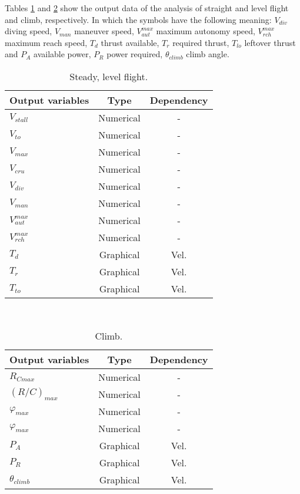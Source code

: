 \documentclass[10pt]{SelfArx} %
\begin{document}
Tables \ref{Tab:output_steady} and \ref{Tab:output_climb} show the output data of the analysis of straight and level flight and climb, respectively.  In which the symbols have the following meaning: $V_{div}$ diving speed, $V_{man}$ maneuver speed, $V_{aut}^{max}$ maximum autonomy speed, $V_{rch}^{max}$ maximum reach speed, $T_{d}$ thrust available, $T_{r}$ required thrust, $T_{lo}$ leftover thrust and $P_{A}$ available power, $P_{R}$ power required, $\theta_{climb}$ climb angle.

\begin{table}[htb]
\small\sf\centering
\caption{Steady, level flight.\label{Tab:output_steady}}
\begin{tabular}{lcc}
\toprule
Output variables 		&Type 		&Dependency 	\\
\midrule
{$V_{stall}$} 		&Numerical 		&- 			\\
{$V_{to}$} 			&Numerical 		&- 			\\
{$V_{max}$} 		&Numerical 		&- 			\\
{$V_{cru}$} 			&Numerical 		&- 			\\
{$V_{div}$} 			&Numerical 		&- 			\\
{$V_{man}$} 		&Numerical 		&- 			\\
{$V_{aut}^{max}$} 	&Numerical 		&- 			\\
{$V_{rch}^{max}$} 	&Numerical 		&- 			\\
{$T_{d}$} 			&Graphical 		&Vel. 			\\
{$T_{r}$} 			&Graphical 		&Vel. 			\\
{$T_{to}$} 			&Graphical 		&Vel. 			\\
\bottomrule
\end{tabular}\\[16pt]
\end{table}

\begin{table}[htb]
\small\sf\centering
\caption{Climb.\label{Tab:output_climb}}
\begin{tabular}{lcc}
\toprule
Output variables 				&Type 		&Dependency 	\\
\midrule
{$R_{Cmax}$} 				&Numerical		&- 			\\
{$(R/C)_{max}$}				&Numerical 		&- 			\\
{$\varphi_{max}$}				&Numerical 		&- 			\\
{$\varphi_{max}$}				&Numerical 		&- 			\\
{$P_{A}$}					&Graphical 		&Vel.			\\
{$P_{R}$}					&Graphical 		&Vel.			\\
{$\theta_{climb}$} 				&Graphical 		&Vel.			\\
\bottomrule
\end{tabular}\\[10pt]
\end{table}
\end{document}
